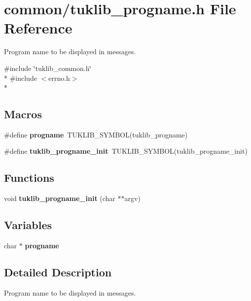 \section{common/tuklib\-\_\-progname.h File Reference}
\label{tuklib__progname_8h}


Program name to be displayed in messages.  


{\ttfamily \#include \char`\"{}tuklib\-\_\-common.\-h\char`\"{}}\\*
{\ttfamily \#include $<$errno.\-h$>$}\\*
\subsection*{Macros}
\begin{DoxyCompactItemize}
\item 
\#define {\bfseries progname}~T\-U\-K\-L\-I\-B\-\_\-\-S\-Y\-M\-B\-O\-L(tuklib\-\_\-progname)\label{tuklib__progname_8h_a9dba1968cf53f4d45f138c8bc217086b}

\item 
\#define {\bfseries tuklib\-\_\-progname\-\_\-init}~T\-U\-K\-L\-I\-B\-\_\-\-S\-Y\-M\-B\-O\-L(tuklib\-\_\-progname\-\_\-init)\label{tuklib__progname_8h_aebe9b1cabbd157047189c460141bedf7}

\end{DoxyCompactItemize}
\subsection*{Functions}
\begin{DoxyCompactItemize}
\item 
void {\bfseries tuklib\-\_\-progname\-\_\-init} (char $\ast$$\ast$argv)\label{tuklib__progname_8h_a2d6344889dbe31cea9e5574f671e55dc}

\end{DoxyCompactItemize}
\subsection*{Variables}
\begin{DoxyCompactItemize}
\item 
char $\ast$ {\bfseries progname}\label{tuklib__progname_8h_ab9e1449fd00c98428516f0b41eddcb10}

\end{DoxyCompactItemize}


\subsection{Detailed Description}
Program name to be displayed in messages. 